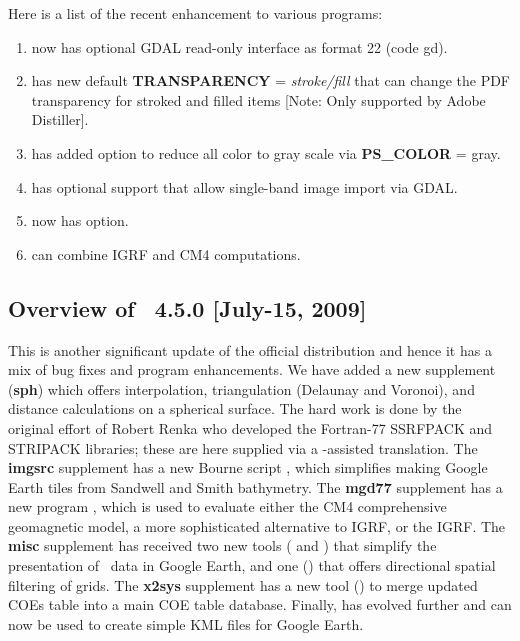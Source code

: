 Here is a list of the recent enhancement to various programs:

\begin{enumerate}
	\item {} now has optional GDAL read-only interface as format 22 (code gd).
	\item {} has new default {\bf TRANSPARENCY} = {\it stroke/fill} that can
	change the PDF transparency for stroked and filled items [Note: Only supported by Adobe Distiller].
	\item {} has added option to reduce all color to gray scale via {\bf PS\_COLOR} = gray.
	\item {} has optional support that allow single-band image import via GDAL.
	\item {} now has  option.
	\item {} can combine IGRF and CM4 computations.
\end{enumerate}

\subsection{Overview of \gmt\ 4.5.0 [July-15, 2009]}

This is another significant update of the official distribution and hence it has a mix of bug fixes
and program enhancements.  We have added a new supplement ({\bf sph}) which
offers interpolation, triangulation (Delaunay and Voronoi), and distance calculations on a 
spherical surface.  The hard work is done by the original effort of Robert Renka who developed
the Fortran-77 SSRFPACK and STRIPACK libraries; these are here supplied via a -assisted
translation.
The {\bf imgsrc} supplement has a new Bourne script , which simplifies
making Google Earth tiles from Sandwell and Smith bathymetry. The {\bf mgd77} supplement
has a new program , which is used to evaluate either the CM4 comprehensive geomagnetic
model, a more sophisticated alternative to IGRF, or the IGRF. The {\bf misc} supplement has received
two new tools ( and ) that simplify the presentation of \GMT\ data
in Google Earth, and one () that offers directional spatial filtering of grids.
The {\bf x2sys} supplement has a new tool () to merge updated COEs table into a main COE table database.
Finally,  has evolved further and can now be used to create simple KML files for Google Earth.

